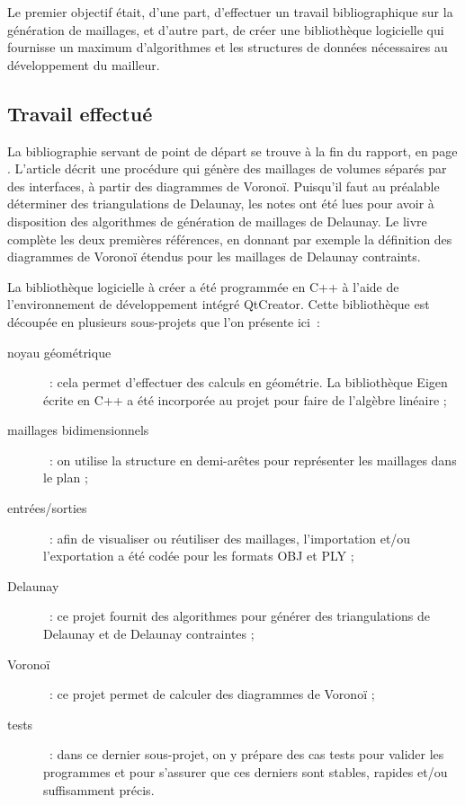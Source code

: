 \documentclass[12pt,a4paper,draft]{report}
\begin{document}
Le premier objectif était, d'une part, d'effectuer un travail bibliographique sur la génération de maillages, et d'autre part, de créer une bibliothèque logicielle qui fournisse un maximum d'algorithmes et les structures de données nécessaires au développement du mailleur.

\subsection{Travail effectué}

La bibliographie servant de point de départ se trouve à la fin du rapport, en page \pageref{biblio}. L'article \cite{Garimella} décrit une procédure qui génère des maillages de volumes séparés par des interfaces, à partir des diagrammes de Voronoï. Puisqu'il faut au préalable déterminer des triangulations de Delaunay, les notes \cite{delnotes} ont été lues pour avoir à disposition des algorithmes de génération de maillages de Delaunay. Le livre \cite{Edelsbrunner} complète les deux premières références, en donnant par exemple la définition des diagrammes de Voronoï étendus pour les maillages de Delaunay contraints.

La bibliothèque logicielle à créer a été programmée en C++ à l'aide de l'environnement de développement intégré QtCreator. Cette bibliothèque est découpée en plusieurs sous-projets que l'on présente ici~:
\begin{description}
\item[noyau géométrique]~: cela permet d'effectuer des calculs en géométrie. La bibliothèque Eigen écrite en C++ a été incorporée au projet pour faire de l'algèbre linéaire ;
\item[maillages bidimensionnels]~: on utilise la structure en demi-arêtes pour représenter les maillages dans le plan ;
\item[entrées/sorties]~: afin de visualiser ou réutiliser des maillages, l'importation et/ou l'exportation a été codée pour les formats OBJ et PLY ;
\item[Delaunay]~: ce projet fournit des algorithmes pour générer des triangulations de Delaunay et de Delaunay contraintes ;
\item[Voronoï]~: ce projet permet de calculer des diagrammes de Voronoï ;
\item[tests]~: dans ce dernier sous-projet, on y prépare des cas tests pour valider les programmes et pour s'assurer que ces derniers sont stables, rapides et/ou suffisamment précis.
\end{description}
\end{document}
